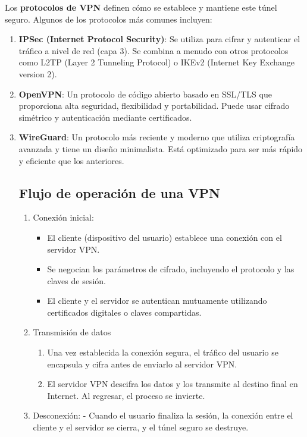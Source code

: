 Los \textbf{protocolos de VPN} definen cómo se establece y mantiene este túnel seguro. Algunos de los protocolos más comunes incluyen:
\begin{enumerate}
   \item \textbf{IPSec (Internet Protocol Security)}: Se utiliza para cifrar y autenticar el tráfico a nivel de red (capa 3). Se combina a menudo con otros protocolos como L2TP (Layer 2 Tunneling Protocol) o IKEv2 (Internet Key Exchange version 2).
   \item \textbf{OpenVPN}: Un protocolo de código abierto basado en SSL/TLS que proporciona alta seguridad, flexibilidad y portabilidad. Puede usar cifrado simétrico y autenticación mediante certificados.
   
   \item \textbf{WireGuard}: Un protocolo más reciente y moderno que utiliza criptografía avanzada y tiene un diseño minimalista. Está optimizado para ser más rápido y eficiente que los anteriores.

\subsection{Flujo de operación de una VPN}
\begin{enumerate}
    \item Conexión inicial:
    \begin{itemize}
        \item El cliente (dispositivo del usuario) establece una conexión con el servidor VPN.
        \item Se negocian los parámetros de cifrado, incluyendo el protocolo y las claves de sesión.
        \item El cliente y el servidor se autentican mutuamente utilizando certificados digitales o claves compartidas.
    \end{itemize}

   \item Transmisión de datos
        \begin{enumerate}
            \item Una vez establecida la conexión segura, el tráfico del usuario se encapsula y cifra antes de enviarlo al servidor VPN.
            \item El servidor VPN descifra los datos y los transmite al destino final en Internet. Al regresar, el proceso se invierte.
        \end{enumerate}
    \item Desconexión:
   - Cuando el usuario finaliza la sesión, la conexión entre el cliente y el servidor se cierra, y el túnel seguro se destruye.


\end{enumerate}
\end{enumerate}
